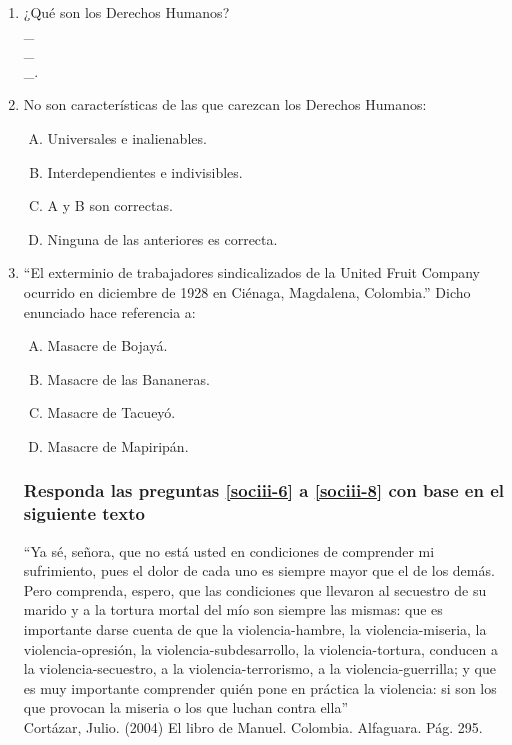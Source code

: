 \begin{enumerate}

\item ¿Qué son los Derechos Humanos?\label{sociii-3}
\hrulefill\\
\_\hrulefill\\
\_\hrulefill\\
\_\hrulefill.


\item No son características de las que carezcan los Derechos Humanos:\label{sociii-4}


\begin{enumerate}[(A)]
\item   Universales e inalienables.
 \item  Interdependientes e indivisibles.
\item A y B son correctas.
\item Ninguna de las anteriores es correcta.
\end{enumerate}



\item  ``El exterminio de trabajadores sindicalizados de la United Fruit Company ocurrido en diciembre de 1928 en Ciénaga, Magdalena, Colombia.'' Dicho enunciado hace referencia a:\label{sociii-5}


\begin{enumerate}[(A)]
\item   Masacre de Bojayá.
 \item  Masacre de las Bananeras.
\item Masacre de Tacueyó.
\item Masacre de Mapiripán.
\end{enumerate}



\subsubsection*{Responda las preguntas \ref{sociii-6} a \ref{sociii-8} con base en el siguiente texto}

``Ya sé, señora, que no está usted en condiciones de comprender mi sufrimiento, pues el dolor de cada uno es siempre mayor que el de los demás. Pero comprenda, espero, que las condiciones que llevaron al secuestro de su marido y a la tortura mortal del mío son siempre las mismas: que es importante darse cuenta de que la violencia-hambre, la violencia-miseria, la violencia-opresión, la violencia-subdesarrollo, la violencia-tortura, conducen a la violencia-secuestro, a la violencia-terrorismo, a la violencia-guerrilla; y que es muy importante comprender quién pone en práctica la violencia: si son los que provocan la miseria o los que luchan contra ella'' \\ {\footnotesize Cortázar, Julio. (2004) El libro de Manuel. Colombia. Alfaguara. Pág. 295.}


\end{enumerate}
